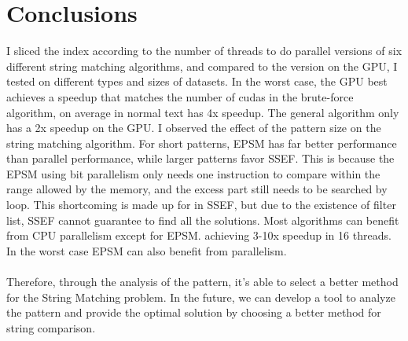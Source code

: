 \documentclass[11pt]{article}       %
\begin{document}
\section{Conclusions} \label{concl}

I sliced the index according to the number of threads to do parallel versions of six different string matching algorithms, and compared to the version on the GPU, I tested on different types and sizes of datasets. In the worst case, the GPU best achieves a speedup that matches the number of cudas in the brute-force algorithm, on average in normal text has 4x speedup. The general algorithm only has a 2x speedup on the GPU. I observed the effect of the pattern size on the string matching algorithm. For short patterns, EPSM has far better performance than parallel performance, while larger patterns favor SSEF. This is because the EPSM using bit parallelism only needs one instruction to compare within the range allowed by the memory, and the excess part still needs to be searched by loop. This shortcoming is made up for in SSEF, but due to the existence of filter list, SSEF cannot guarantee to find all the solutions. Most algorithms can benefit from CPU parallelism except for EPSM. achieving 3-10x speedup in 16 threads. In the worst case EPSM can also benefit from parallelism.\\
\\Therefore, through the analysis of the pattern, it's able to select a better method for the String Matching problem. In the future, we can develop a tool to analyze the pattern and provide the optimal solution by choosing a better method for string comparison.
\end{document}
